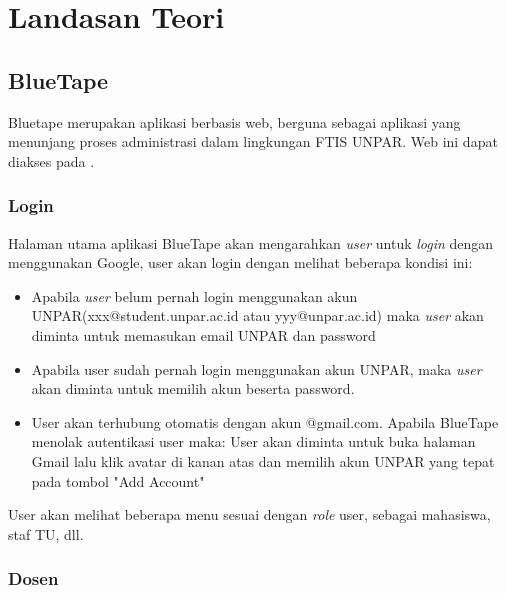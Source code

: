 \chapter{Landasan Teori}


\section{BlueTape}
Bluetape merupakan aplikasi berbasis web, berguna sebagai aplikasi yang menunjang proses administrasi dalam lingkungan FTIS UNPAR. Web ini dapat diakses pada . \cite{blueTape}

\subsection{Login}
\label{ss:login}
Halaman utama aplikasi BlueTape akan mengarahkan \textit{user} untuk \textit{login} dengan menggunakan Google, user akan login dengan melihat beberapa kondisi ini:
\begin{itemize}
	\item Apabila \textit{user} belum pernah login menggunakan akun UNPAR(xxx@student.unpar.ac.id atau yyy@unpar.ac.id) maka  \textit{user} akan diminta untuk memasukan email UNPAR dan password
	\item Apabila user sudah pernah login menggunakan akun UNPAR, maka \textit{user} akan diminta untuk memilih akun beserta password.
	\item User akan terhubung otomatis dengan akun @gmail.com. Apabila BlueTape menolak autentikasi user maka: User akan diminta untuk buka halaman Gmail lalu klik avatar di kanan atas dan memilih akun UNPAR yang tepat pada tombol "Add Account"
\end{itemize}
User akan melihat beberapa menu sesuai dengan \textit{role} user, sebagai mahasiswa, staf TU, dll.

\subsection{Dosen}
